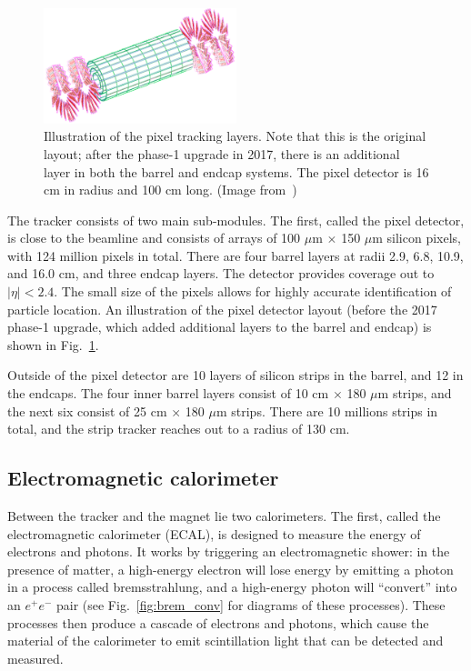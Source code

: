 \begin{figure}[t]
  \begin{center}
    \includegraphics[width=0.50\textwidth]{figs/cms/tracker.png}
    \caption{Illustration of the pixel tracking layers. Note that this is the original layout;
      after the phase-1 upgrade in 2017, there is an additional layer in both the barrel
      and endcap systems. The pixel detector is 16 cm in radius and 100 cm long. (Image from~\cite{CMS:tdr_i})
            }
    \label{fig:cms_tracker}
  \end{center}
\end{figure}

The tracker consists of two main sub-modules. The first, called the pixel detector, 
is close to the beamline and consists of arrays of 100 $\mu$m $\times$ 150 $\mu$m
silicon pixels, with 124 million pixels in total.
There are four barrel layers at radii 2.9, 6.8, 10.9, and 16.0 cm,
and three endcap layers. The detector provides coverage out to $|\eta|<2.4$.
The small size of the pixels allows for highly accurate identification of particle location.
An illustration of the pixel detector layout (before the 2017 phase-1 upgrade, which added
additional layers to the barrel and endcap) is shown in Fig.~\ref{fig:cms_tracker}.

Outside of the pixel detector are 10 layers of silicon strips in the barrel, and 12 in the
endcaps. The four inner barrel layers
consist of 10 cm $\times$ 180 $\mu$m strips, and the next six consist of 
25 cm $\times$ 180 $\mu$m strips. There are 10 millions strips in total,
and the strip tracker reaches out to a radius of 130 cm.

\subsection{Electromagnetic calorimeter}

Between the tracker and the magnet lie two calorimeters. The first,
called the electromagnetic calorimeter (ECAL), is designed to
measure the energy of electrons and photons. It works by triggering
an electromagnetic shower: in the presence of matter, 
a high-energy electron will lose energy by emitting a photon
in a process called bremsstrahlung, and a high-energy photon
will ``convert'' into an $e^+e^-$ pair (see Fig.~\ref{fig:brem_conv}
for diagrams of these processes). These processes then produce a
cascade of electrons and photons, which cause the material of the calorimeter
to emit scintillation light that can be detected and measured.

